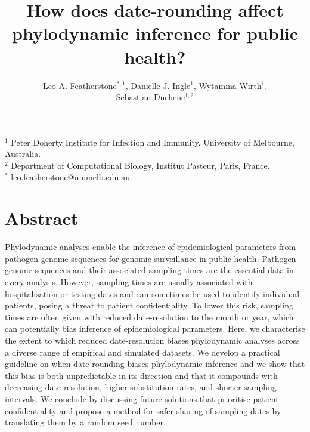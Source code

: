 \documentclass[12pt]{article}
\title{How does date-rounding affect phylodynamic inference for public health?}
\author{Leo A. Featherstone$^{\ast,1}$, Danielle J. Ingle$^{1}$, Wytamma Wirth$^{1}$,\\Sebastian Duchene$^{1,2}$}
\begin{document}
\maketitle

\section*{}
\footnotesize
$^{1}$ Peter Doherty Institute for Infection and Immunity, University of Melbourne, Australia.\\
$^{2}$ Department of Computational Biology, Institut Pasteur, Paris, France.\\
$^{*}$ leo.featherstone@unimelb.edu.au

\normalsize
\linenumbers

\section*{Abstract}
 Phylodynamic analyses enable the inference of epidemiological parameters from pathogen genome sequences for genomic surveillance in public health. Pathogen genome sequences and their associated sampling times are the essential data in every analysis. However, sampling times are usually associated with hospitalisation or testing dates and can sometimes be used to identify individual patients, posing a threat to patient confidentiality. To lower this risk, sampling times are often given with reduced date-resolution to the month or year, which can potentially bias inference of epidemiological parameters. Here, we characterise the extent to which reduced date-resolution biases phylodynamic analyses across a diverse range of empirical and simulated datasets. We develop a practical guideline on when date-rounding biases phylodynamic inference and we show that this bias is both unpredictable in its direction and that it compounds with decreasing date-resolution, higher substitution rates, and shorter sampling intervals. We conclude by discussing future solutions that prioritise patient confidentiality and propose a method for safer sharing of sampling dates by translating them by a random seed number.
\end{document}
